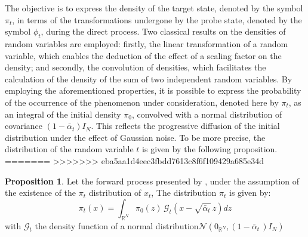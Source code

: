 \documentclass[a4paper,10pt]{article}
\theoremstyle{definition} %
\theoremstyle{definition} %
\newtheorem{proposition}[definition]{Proposition}
\theoremstyle{definition} %
\theoremstyle{definition} %
\newcommand{\R}{\mathbb{R}}
\newcommand{\0}{\boldsymbol{0}}
\begin{document}
The objective is to express the density of the target state, denoted by the symbol $\pi_t$, in terms of the transformations undergone by the probe state, denoted by the symbol $\phi_t$, during the direct process. Two classical results on the densities of random variables are employed: firstly, the linear transformation of a random variable, which enables the deduction of the effect of a scaling factor on the density; and secondly, the convolution of densities, which facilitates the calculation of the density of the sum of two independent random variables. By employing the aforementioned properties, it is possible to express the probability of the occurrence of the phenomenon under consideration, denoted here by $\pi_t$, as an integral of the initial density $\pi_0$, convolved with a normal distribution of covariance \((1 - \bar{\alpha}_t) I_N\). This reflects the progressive diffusion of the initial distribution under the effect of Gaussian noise. To be more precise, the distribution of the random variable $t$ is given by the following proposition.
=======
>>>>>>> eba5aa1d4eec3fbdd7613c8f6f109429a685e34d
\begin{proposition}\label{prop:distribution_a_etap_t}
    Let the forward process presented by , under the assumption of the existence of the $\pi_t$ distribution of $x_t$, The distribution $\pi_t$ is given by:    
    \begin{equation}\label{eq:distribution_pi_t}
        \pi_t(x) = \int_{\R^N} \pi_0(z)\, \mathcal{G}_t(x - \sqrt{\bar \alpha_t}\,z) dz
    \end{equation}
    with $\mathcal{G}_t$ the density function of a normal distribution$\mathcal{N}\left(0_{\R^N}, (1- \bar\alpha _t \,)I_N\right)$
\end{proposition}
\end{document}
